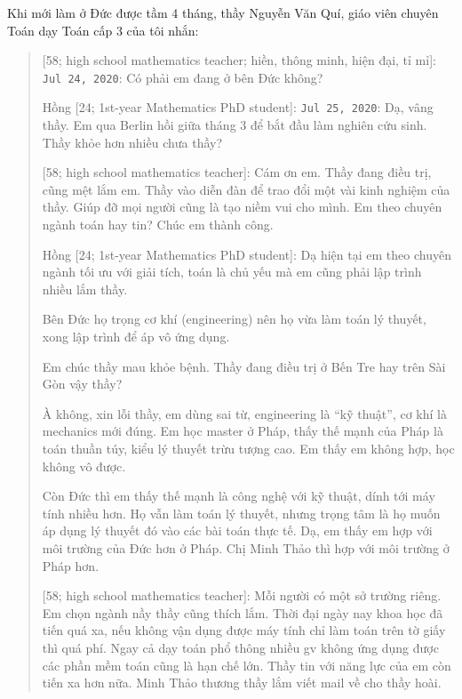 \documentclass[12pt,oneside]{book}
\begin{document}
\begin{flushright}
	\musEighth[\href{https://www.youtube.com/watch?v=dIbeazAlxM4}{\small{\sc Chopin} {\it Ballade No. 1 in G Minor}}]\musEighth
\end{flushright}
Khi mới làm ở Đức được tầm 4 tháng, thầy {\sc Nguyễn Văn Quí}, giáo viên chuyên Toán dạy Toán cấp 3 của tôi nhắn:
\begin{quote}
	{ [58; high school mathematics teacher; hiền, thông minh, hiện đại, tỉ mỉ]}: {\tt Jul 24, 2020}: Có phải em đang ở bên Đức không?
	
	{\sf Hồng [24; 1st-year Mathematics PhD student]}: {\tt Jul 25, 2020}: Dạ, vâng thầy. Em qua Berlin hồi giữa tháng 3 để bắt đầu làm nghiên cứu sinh. Thầy khỏe hơn nhiều chưa thầy?
	
	{ [58; high school mathematics teacher]}: Cám ơn em. Thầy đang điều trị, cũng mệt lắm em. Thầy vào diễn đàn để trao đổi một vài kinh nghiệm của thầy. Giúp đỡ mọi người cũng là tạo niềm vui cho mình. Em theo chuyên ngành toán hay tin? Chúc em thành công.
	
	{\sf Hồng [24; 1st-year Mathematics PhD student]}: Dạ hiện tại em theo chuyên ngành tối ưu với giải tích, toán là chủ yếu mà em cũng phải lập trình nhiều lắm thầy.
	
	Bên Đức họ trọng cơ khí (engineering) nên họ vừa làm toán lý thuyết, xong lập trình để áp vô ứng dụng.
	
	Em chúc thầy mau khỏe bệnh. Thầy đang điều trị ở Bến Tre hay trên Sài Gòn vậy thầy?
	
	À không, xin lỗi thầy, em dùng sai từ, engineering là ``kỹ thuật'', cơ khí là mechanics mới đúng. Em học master ở Pháp, thấy thế mạnh của Pháp là toán thuần túy, kiểu lý thuyết trừu tượng cao. Em thấy em không hợp, học không vô được.
	
	Còn Đức thì em thấy thế mạnh là công nghệ với kỹ thuật, dính tới máy tính nhiều hơn. Họ vẫn làm toán lý thuyết, nhưng trọng tâm là họ muốn áp dụng lý thuyết đó vào các bài toán thực tế. Dạ, em thấy em hợp với môi trường của Đức hơn ở Pháp. Chị {\sc Minh Thảo} thì hợp với môi trường ở Pháp hơn.
	
	{ [58; high school mathematics teacher]}: Mỗi người có một sở trường riêng. Em chọn ngành nầy thầy cũng thích lắm. Thời đại ngày nay khoa học đã tiến quá xa, nếu không vận dụng được máy tính chỉ làm toán trên tờ giấy thì quá phí. Ngay cả dạy toán phổ thông nhiều gv không ứng dụng được các phần mềm toán cũng là hạn chế lớn. Thầy tin với năng lực của em còn tiến xa hơn nữa. {\sc Minh Thảo} thương thầy lắm viết mail về cho thầy hoài.
	

\end{quote}
\end{document}
